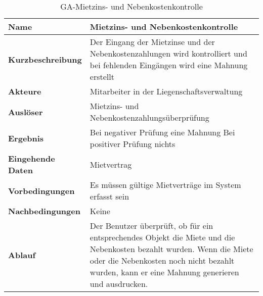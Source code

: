 \begin{table}[H]
  \centering
  \settowidth{}
  \setlength\extrarowheight{2pt}
  \begin{tabulary}{1.0\textwidth}{|a|m{12cm}|}
    \hline
    \textbf{Name}&Mietzins- und Nebenkostenkontrolle\\
    \hline 
    \textbf{Kurzbeschreibung} & Der Eingang der Mietzinse und der Nebenkostenzahlungen wird kontrolliert und bei fehlenden Eingängen wird eine Mahnung erstellt\\
    \hline
    \textbf{Akteure} & Mitarbeiter in der Liegenschaftsverwaltung\\
    \hline
    \textbf{Auslöser} & Mietzins- und Nebenkostenzahlungsüberprüfung\\
    \hline
    \textbf{Ergebnis} & Bei negativer Prüfung eine Mahnung\newline 
    Bei positiver Prüfung nichts\\
    \hline
    \textbf{Eingehende Daten} & Mietvertrag\\
    \hline
    \textbf{Vorbedingungen} & Es müssen gültige Mietverträge im System erfasst sein \\
    \hline
    \textbf{Nachbedingungen} & Keine \\
    \hline
    \textbf{Ablauf} & Der Benutzer überprüft, ob für ein entsprechendes Objekt die Miete und die Nebenkosten bezahlt wurden. Wenn die Miete oder die Nebenkosten noch nicht bezahlt wurden, kann er eine Mahnung generieren und ausdrucken.\\
    \hline
  \end{tabulary}
  \caption{GA-Mietzins- und Nebenkostenkontrolle}
\end{table}

